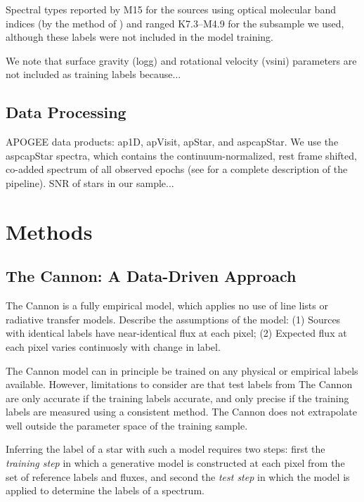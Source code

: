 \documentclass[preprint]{aastex62}
\begin{document}
Spectral types reported by M15 for the sources using optical molecular band indices (by the method of \citealt{Lepine:2013}) and ranged K7.3--M4.9 for the subsample we used, although these labels were not included in the model training.

We note that surface gravity (logg) and rotational velocity (vsini) parameters are not included as training labels because...
\color{gcolor}{MANN: comments to add? particularly about the extension sample?}\color{black}

\subsection{Data Processing}

APOGEE data products: ap1D, apVisit, apStar, and aspcapStar. We use the aspcapStar spectra, which contains the continuum-normalized, rest frame shifted, co-added spectrum of all observed epochs (see \citealt{Perez:2016} for a complete description of the pipeline). SNR of stars in our sample...


\section{Methods} \label{sec:cannon}

\subsection{The Cannon: A Data-Driven Approach}

The Cannon is a fully empirical model, which applies no use of line lists or radiative transfer models. Describe the assumptions of the model: (1) Sources with identical labels have near-identical flux at each pixel; (2) Expected flux at each pixel varies continuosly with change in label. 

The Cannon model can in principle be trained on any physical or empirical labels available. However, limitations to consider are that test labels from The Cannon are only accurate if the training labels accurate, and only precise if the training labels are measured using a consistent method. The Cannon does not extrapolate well outside the parameter space of the training sample.

Inferring the label of a star with such a model requires two steps: first the \emph{training step} in which a generative model is constructed at each pixel from the set of reference labels and fluxes, and second the \emph{test step} in which the model is applied to determine the labels of a spectrum.
\end{document}
